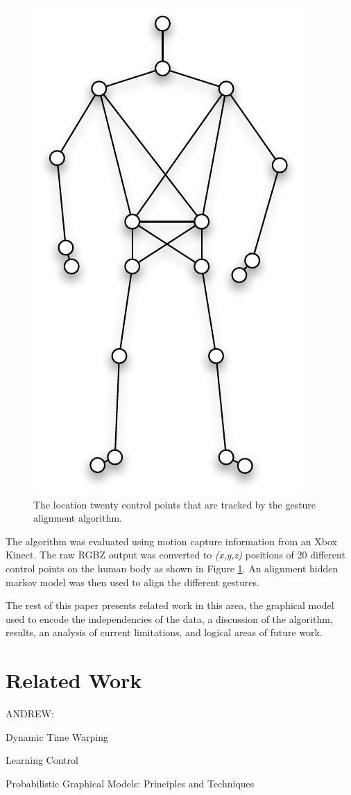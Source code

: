 \documentclass{article}
\begin{document}
\begin{figure}
\begin{centering}
\includegraphics[width=0.4\columnwidth]{figures/control_points.pdf}

\caption{The location twenty control points that are tracked by the gesture alignment
algorithm.\label{figure:control_points}}

\end{centering}
\end{figure}

The algorithm was evaluated using motion capture information from an Xbox
Kinect. The raw RGBZ output was converted to \emph{(x,y,z)} positions of 20
different control points on the human body as shown in Figure
\ref{figure:control_points}. An alignment hidden markov model was then used to
align the different gestures.

The rest of this paper presents related work in this area, the graphical model
used to encode the independencies of the data, a discussion of the algorithm,
results, an analysis of current limitations, and logical areas of future work.


\section{Related Work}

ANDREW:

Dynamic Time Warping \cite{Listgarten2005}

Learning Control \cite{Coates2008}

Probabilistic Graphical Models: Principles and Techniques \cite{Koller2009}
\end{document}
